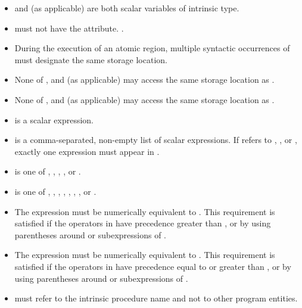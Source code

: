 \begin{itemize}
\item {} and  (as applicable) are both scalar variables of intrinsic type.

\item {} must not have the  attribute. .

\item During the execution of an atomic region, multiple syntactic occurrences of  must 
designate the same storage location.

\item None of ,  and  (as applicable) may access the same storage location as 
. 

\item None of ,  and  (as applicable) may access the same storage location as 
.

\item {} is a scalar expression.

\item {} is a comma-separated, non-empty list of scalar expressions. If 
 refers to , , or , exactly one expression 
must appear in .

\item {} is one of , , , , or .

\item {} is one of \code{+}, \code{*}, \code{-}, \code{/}, , , , or .

\item The expression  must be numerically equivalent to . 
This requirement is satisfied if the operators in  have precedence greater than 
, or by using parentheses around  or subexpressions of .

\item The expression  must be numerically equivalent to . This requirement is satisfied if the operators in  have precedence equal to or 
greater than , or by using parentheses around  or subexpressions of .

\item {} must refer to the intrinsic procedure name and not to other 
program entities.


\end{itemize}
